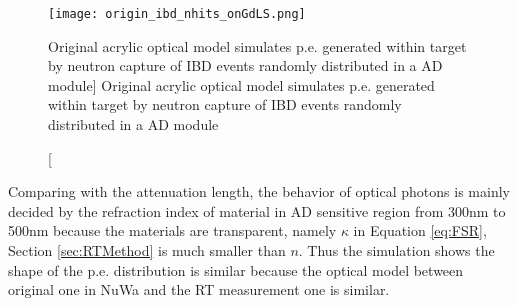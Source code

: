 \begin{figure}
    \centering
    \texttt{[image: origin\_ibd\_nhits\_onGdLS.png]}
    \caption
    [Original acrylic optical model simulates p.e. generated within target by neutron capture of IBD events randomly distributed in a AD module]
    {Original acrylic optical model simulates p.e. generated within target by neutron capture of IBD events randomly distributed in a AD module}
    \label{fig:origin_ibd_nhits_onGdLS}
    \end{figure}

%
%
%
%
%

Comparing with the attenuation length, the behavior of optical photons is mainly decided by the refraction index of material in AD sensitive
region from 300nm to 500nm because the materials are transparent, namely $\kappa$ in Equation \ref{eq:FSR}, Section \ref{sec:RTMethod}
is much smaller than $n$. Thus the simulation shows the shape of the p.e. distribution is similar
because the optical model between original one in NuWa and the RT measurement one is similar.


